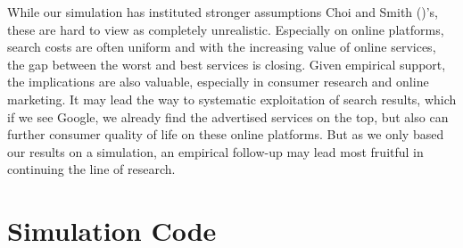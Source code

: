 \documentclass[12pt]{article}
\begin{document}
While our simulation has instituted stronger assumptions Choi and Smith (\citeyear{Choi})'s, these are hard to view as completely unrealistic. Especially on online platforms, search costs are often uniform and with the increasing value of online services, the gap between the worst and best services is closing. Given empirical support, the implications are also valuable, especially in consumer research and online marketing. It may lead the way to systematic exploitation of search results, which if we see Google, we already find the advertised services on the top, but also can further consumer quality of life on these online platforms. But as we only based our results on a simulation, an empirical follow-up may lead most fruitful in continuing the line of research.
\printbibliography

\appendix
\section{Simulation Code}
\end{document}
